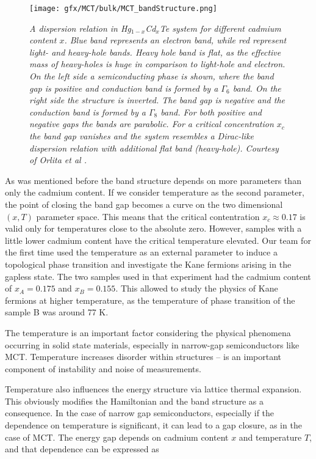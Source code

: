 \documentclass[titlepage,a4paper]{book}
\begin{document}
\begin{figure}[ht]
	\centering
	\texttt{[image: gfx/MCT/bulk/MCT\_bandStructure.png]}
	\vspace{-10pt}
	\caption{\textit{A dispersion relation in Hg$_{1-x}$Cd$_x$Te system for different cadmium content $x$. Blue band represents an electron band, while red represent light- and heavy-hole bands. Heavy hole band is flat, as the effective mass of heavy-holes is huge in comparison to light-hole and electron. On the left side a semiconducting phase is shown, where the band gap is positive and conduction band is formed by a $\Gamma_6$ band. On the right side the structure is inverted. The band gap is negative and the conduction band is formed by a $\Gamma_8$ band. For both positive and negative gaps the bands are parabolic. For a critical concentration $x_c$ the band gap vanishes and the system resembles a Dirac-like dispersion relation with additional flat band (heavy-hole). Courtesy of Orlita et al \cite{Orlita_MCT}.}}
	\label{fig:MCT_bandStructure}
\end{figure} 

As was mentioned before the band structure depends on more parameters than only the cadmium content. If we consider temperature as the second parameter, the point of closing the band gap becomes a curve on the two dimensional $(x, T)$ parameter space. This means that the critical contentration $x_c \approx 0.17$ is valid only for temperatures close to the absolute zero. However, samples with a little lower cadmium content have the critical temperature elevated. Our team \cite{Teppe_MCT} for the first time used the temperature as an external parameter to induce a topological phase transition and investigate the Kane fermions arising in the gapless state. The two samples used in that experiment had the cadmium content of $x_A = 0.175$ and $x_B = 0.155$. This allowed to study the physics of Kane fermions at higher temperature, as the temperature of phase transition of the sample B was around 77 K.  

The temperature is an important factor considering the physical phenomena occurring in solid state materials, especially in narrow-gap semiconductors like MCT. Temperature increases disorder within structures -- is an important component of instability and noise of measurements.

Temperature also influences the energy structure via lattice thermal expansion. This obviously modifies the Hamiltonian and the band structure as a consequence. In the case of narrow gap semiconductors, especially if the dependence on temperature is significant, it can lead to a gap closure, as in the case of MCT. The energy gap depends on cadmium content $x$ and temperature $T$, and that dependence can be expressed as
\end{document}
